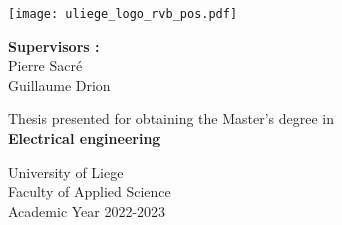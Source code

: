 \begin{titlepage}
    \centering
    
    \thispagestyle{empty}
    \vspace*{1cm}
        
    \Huge
    \textbf{\mytitle}
        
    \vspace{0.5cm}
    \LARGE
    \mysubtitle
        
    \vspace{1.5cm}
        
    {\bfseries \myname}
    
    \vfill
    
    \texttt{[image: uliege\_logo\_rvb\_pos.pdf]}
    
    \vfill
    
    \Large
    \textbf{Supervisors :}\\
    Pierre Sacr\'e\\
    Guillaume Drion
    \LARGE
        
    \vfill
        
    Thesis presented for obtaining the Master's degree in\\
    \textbf{Electrical engineering}
        
    \vspace{0.8cm}
        
        
    \Large
    University of Liege\\
    Faculty of Applied Science\\
    Academic Year 2022-2023
            
\end{titlepage}
\restoregeometry
